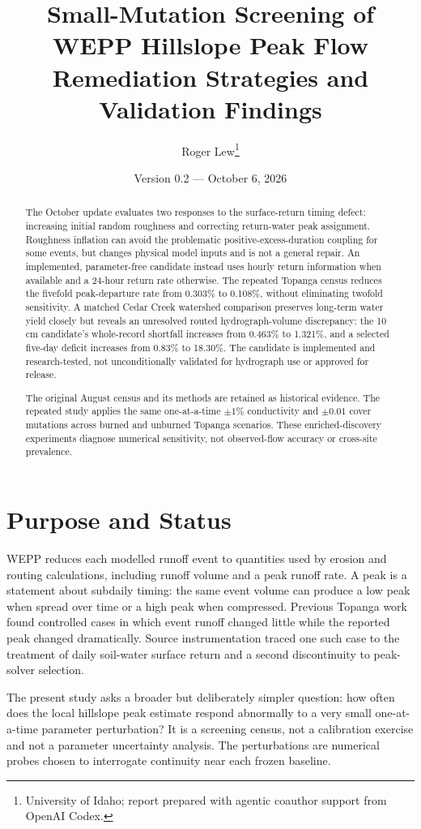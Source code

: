 \documentclass[11pt]{article}
\title{Small-Mutation Screening of WEPP Hillslope Peak Flow\\
\large Remediation Strategies and Validation Findings}
\author{Roger Lew\thanks{University of Idaho; report prepared with agentic coauthor support from OpenAI Codex.}}
\date{Version 0.2 --- October 6, 2026}
\begin{document}
\maketitle

\begin{abstract}
The October update evaluates two responses to the surface-return timing defect:
increasing initial random roughness and correcting return-water peak assignment.
Roughness inflation can avoid the problematic positive-excess-duration coupling
for some events, but changes physical model inputs and is not a general repair.
An implemented, parameter-free candidate instead uses hourly return information
when available and a 24-hour return rate otherwise. The repeated Topanga census
reduces the fivefold peak-departure rate from 0.303\% to 0.108\%, without
eliminating twofold sensitivity. A matched Cedar Creek watershed comparison
preserves long-term water yield closely but reveals an unresolved routed
hydrograph-volume discrepancy: the 10 cm candidate's whole-record shortfall
increases from 0.463\% to 1.321\%, and a selected five-day deficit increases
from 0.83\% to 18.30\%. The candidate is implemented and research-tested,
not unconditionally validated for hydrograph use or approved for release.

The original August census and its methods are retained as historical evidence.
The repeated study applies the same one-at-a-time $\pm1\%$ conductivity and
$\pm0.01$ cover mutations across burned and unburned Topanga scenarios.
These enriched-discovery experiments diagnose numerical sensitivity, not
observed-flow accuracy or cross-site prevalence.
\end{abstract}

\section{Purpose and Status}

WEPP reduces each modelled runoff event to quantities used by erosion and
routing calculations, including runoff volume and a peak runoff rate. A peak
is a statement about subdaily timing: the same event volume can produce a low
peak when spread over time or a high peak when compressed. Previous Topanga
work found controlled cases in which event runoff changed little while the
reported peak changed dramatically. Source instrumentation traced one such
case to the treatment of daily soil-water surface return and a second
discontinuity to peak-solver selection.

The present study asks a broader but deliberately simpler question: how often
does the local hillslope peak estimate respond abnormally to a very small
one-at-a-time parameter perturbation? It is a screening census, not a
calibration exercise and not a parameter uncertainty analysis. The perturbations
are numerical probes chosen to interrogate continuity near each frozen baseline.
\end{document}
